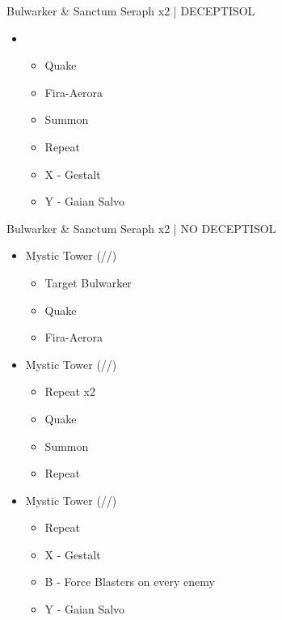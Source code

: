 \begin{battle}[0:14]{Bulwarker \& Sanctum Seraph x2 | DECEPTISOL}
	\begin{itemize}
		\item \second
		      \begin{itemize}
			      \item Quake
			      \item Fira-Aerora
			      \item Summon
			      \item Repeat
			      \item X - Gestalt
			      \item Y - Gaian Salvo
		      \end{itemize}
	\end{itemize}
\end{battle}
\renewcommand{\fourth}{[4] Mystic Tower (\rav/\sen/\rav)}
\renewcommand{\fifth}{[5] Mystic Tower (\rav/\sen/\rav)}
\begin{battle}[1:00]{Bulwarker \& Sanctum Seraph x2 | NO DECEPTISOL}
	\begin{itemize}
		\item \fourth
		      \begin{itemize}
		      		\item Target Bulwarker
			      \item Quake
			      \item Fira-Aerora
		      \end{itemize}
		\item \fifth
			\begin{itemize}
				\item Repeat x2
				\item Quake
				\item Summon
				\item Repeat
			\end{itemize}
		\item \fourth
			\begin{itemize}
				\item Repeat
				\item X - Gestalt
				\item B - Force Blasters on every enemy
				\item Y - Gaian Salvo
			\end{itemize}
	\end{itemize}
\end{battle}
\vfill
